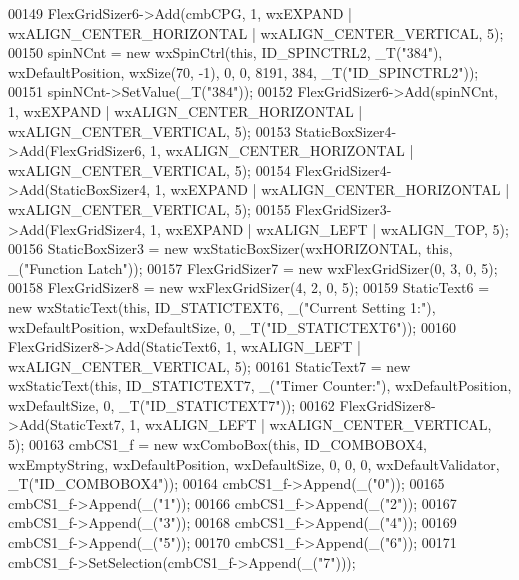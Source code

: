 \begin{DoxyCode}
00149     FlexGridSizer6->Add(cmbCPG, 1, wxEXPAND | wxALIGN\_CENTER\_HORIZONTAL | wxALIGN\_CENTER\_VERTICAL, 5);
00150     spinNCnt = \textcolor{keyword}{new} wxSpinCtrl(\textcolor{keyword}{this}, ID\_SPINCTRL2, \_T(\textcolor{stringliteral}{"384"}), wxDefaultPosition, wxSize(70, -1), 0, 0, 8191,
       384, \_T(\textcolor{stringliteral}{"ID\_SPINCTRL2"}));
00151     spinNCnt->SetValue(\_T(\textcolor{stringliteral}{"384"}));
00152     FlexGridSizer6->Add(spinNCnt, 1, wxEXPAND | wxALIGN\_CENTER\_HORIZONTAL | wxALIGN\_CENTER\_VERTICAL, 5);
00153     StaticBoxSizer4->Add(FlexGridSizer6, 1, wxALIGN\_CENTER\_HORIZONTAL | wxALIGN\_CENTER\_VERTICAL, 5);
00154     FlexGridSizer4->Add(StaticBoxSizer4, 1, wxEXPAND | wxALIGN\_CENTER\_HORIZONTAL | wxALIGN\_CENTER\_VERTICAL,
       5);
00155     FlexGridSizer3->Add(FlexGridSizer4, 1, wxEXPAND | wxALIGN\_LEFT | wxALIGN\_TOP, 5);
00156     StaticBoxSizer3 = \textcolor{keyword}{new} wxStaticBoxSizer(wxHORIZONTAL, \textcolor{keyword}{this}, \_(\textcolor{stringliteral}{"Function Latch"}));
00157     FlexGridSizer7 = \textcolor{keyword}{new} wxFlexGridSizer(0, 3, 0, 5);
00158     FlexGridSizer8 = \textcolor{keyword}{new} wxFlexGridSizer(4, 2, 0, 5);
00159     StaticText6 = \textcolor{keyword}{new} wxStaticText(\textcolor{keyword}{this}, ID\_STATICTEXT6, \_(\textcolor{stringliteral}{"Current Setting 1:"}), wxDefaultPosition, 
      wxDefaultSize, 0, \_T(\textcolor{stringliteral}{"ID\_STATICTEXT6"}));
00160     FlexGridSizer8->Add(StaticText6, 1, wxALIGN\_LEFT | wxALIGN\_CENTER\_VERTICAL, 5);
00161     StaticText7 = \textcolor{keyword}{new} wxStaticText(\textcolor{keyword}{this}, ID\_STATICTEXT7, \_(\textcolor{stringliteral}{"Timer Counter:"}), wxDefaultPosition, 
      wxDefaultSize, 0, \_T(\textcolor{stringliteral}{"ID\_STATICTEXT7"}));
00162     FlexGridSizer8->Add(StaticText7, 1, wxALIGN\_LEFT | wxALIGN\_CENTER\_VERTICAL, 5);
00163     cmbCS1\_f = \textcolor{keyword}{new} wxComboBox(\textcolor{keyword}{this}, ID\_COMBOBOX4, wxEmptyString, wxDefaultPosition, wxDefaultSize, 0, 0, 0,
       wxDefaultValidator, \_T(\textcolor{stringliteral}{"ID\_COMBOBOX4"}));
00164     cmbCS1\_f->Append(\_(\textcolor{stringliteral}{"0"}));
00165     cmbCS1\_f->Append(\_(\textcolor{stringliteral}{"1"}));
00166     cmbCS1\_f->Append(\_(\textcolor{stringliteral}{"2"}));
00167     cmbCS1\_f->Append(\_(\textcolor{stringliteral}{"3"}));
00168     cmbCS1\_f->Append(\_(\textcolor{stringliteral}{"4"}));
00169     cmbCS1\_f->Append(\_(\textcolor{stringliteral}{"5"}));
00170     cmbCS1\_f->Append(\_(\textcolor{stringliteral}{"6"}));
00171     cmbCS1\_f->SetSelection(cmbCS1\_f->Append(\_(\textcolor{stringliteral}{"7"})));

\end{DoxyCode}
